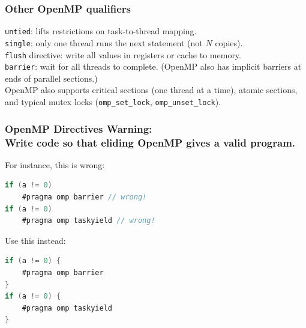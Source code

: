 \begin{frame}[fragile]
  \frametitle{Other OpenMP qualifiers}

  
    {\tt untied}: lifts restrictions on task-to-thread mapping.\\[1em]

    {\tt single}: only one thread runs the next statement (not $N$ copies).\\[1em]

    {\tt flush} directive: write all values in registers or cache to memory.\\[1em]

    {\tt barrier}: wait for all threads to complete. (OpenMP also has implicit
barriers at ends of parallel sections.)\\[1em]

    OpenMP also supports critical sections (one thread at a time), atomic
 sections, and typical mutex locks (\verb+omp_set_lock+,
 \verb+omp_unset_lock+).
  

\end{frame}

\begin{frame}[fragile]
  \frametitle{OpenMP Directives Warning: \\
  Write code so that eliding OpenMP gives a valid program.}
  
  For instance, this is wrong:
  \begin{lstlisting}[language=C,morekeywords={foreach,pragma,omp,parallel,single,nowait,task,untied,barrier,taskyield}]
if (a != 0)
    #pragma omp barrier // wrong!
if (a != 0)
    #pragma omp taskyield // wrong!
  \end{lstlisting}

  Use this instead:
  \begin{lstlisting}[language=C,morekeywords={foreach,pragma,omp,parallel,single,nowait,task,untied,barrier,taskyield}]
if (a != 0) {
    #pragma omp barrier
}
if (a != 0) {
    #pragma omp taskyield
}
  \end{lstlisting}
  

\end{frame}




